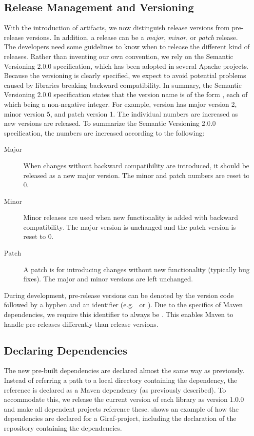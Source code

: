 \subsection{Release Management and Versioning}
With the introduction of artifacts, we now distinguish release versions from pre-release versions. In addition, a release can be a \emph{major}, \emph{minor}, or \emph{patch} release. The developers need some guidelines to know when to release the different kind of releases. Rather than inventing our own convention, we rely on the Semantic Versioning 2.0.0 specification\parencite{semver2015}, which has been adopted in several Apache projects\parencite{apacheapr,apacheisis,apacheaccumulo}. Because the versioning is clearly specified, we expect to avoid potential problems caused by libraries breaking backward compatibility. In summary, the Semantic Versioning 2.0.0 specification states that the version name is of the form , each of which being a non-negative integer. For example, version  has major version 2, minor version 5, and patch version 1. The individual numbers are increased as new versions are released. To summarize the Semantic Versioning 2.0.0 specification, the numbers are increased according to the following:
\begin{description}
  \item[Major] When changes without backward compatibility are introduced, it should be released as a new major version. The minor and patch numbers are reset to 0.
  \item[Minor] Minor releases are used when new functionality is added with backward compatibility. The major version is unchanged and the patch version is reset to 0.
  \item[Patch] A patch is for introducing changes without new functionality (typically bug fixes). The major and minor versions are left unchanged.
\end{description}

During development, pre-release versions can be denoted by the version code followed by a hyphen and an identifier (e.g.\  or ). Due to the specifics of Maven dependencies, we require this identifier to always be . This enables Maven to handle pre-releases differently than release versions.

\subsection{Declaring Dependencies}
The new pre-built dependencies are declared almost the same way as previously. Instead of referring a path to a local directory containing the dependency, the reference is declared as a Maven dependency (as previously described). To accommodate this, we release the current version of each library as version 1.0.0 and make all dependent projects reference these.  shows an example of how the dependencies are declared for a Giraf-project, including the declaration of the repository containing the dependencies.

